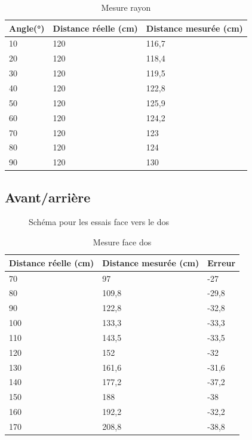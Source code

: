 \documentclass[11pt,a4paper]{article}
\begin{document}
\begin{table}[H]
    \centering
    \begin{tabular}{|l|l|l|}
    \hline
        Angle(°) & Distance réelle (cm) & Distance mesurée (cm) \\ \hline
        10 & 120 & 116,7 \\ \hline
        20 & 120 & 118,4 \\ \hline
        30 & 120 & 119,5 \\ \hline
        40 & 120 & 122,8 \\ \hline
        50 & 120 & 125,9 \\ \hline
        60 & 120 & 124,2 \\ \hline
        70 & 120 & 123 \\ \hline
        80 & 120 & 124 \\ \hline
        90 & 120 & 130 \\ \hline
    \end{tabular}
    \caption{Mesure rayon}
\end{table}

\subsection{Avant/arrière}

\begin{figure}[H]
  \centering
  \FtB
  \caption{Schéma pour les essais face vers le dos}
\end{figure}

\begin{table}[H]
    \centering
    \begin{tabular}{|l|l|l|}
    \hline
        Distance réelle (cm) & Distance mesurée (cm) & Erreur  \\ \hline
        70 & 97 & -27 \\ \hline
        80 & 109,8 & -29,8 \\ \hline
        90 & 122,8 & -32,8 \\ \hline
        100 & 133,3 & -33,3 \\ \hline
        110 & 143,5 & -33,5 \\ \hline
        120 & 152 & -32 \\ \hline
        130 & 161,6 & -31,6 \\ \hline
        140 & 177,2 & -37,2 \\ \hline
        150 & 188 & -38 \\ \hline
        160 & 192,2 & -32,2 \\ \hline
        170 & 208,8 & -38,8 \\ \hline
    \end{tabular}
    \caption{Mesure face dos }
\end{table}
\end{document}
